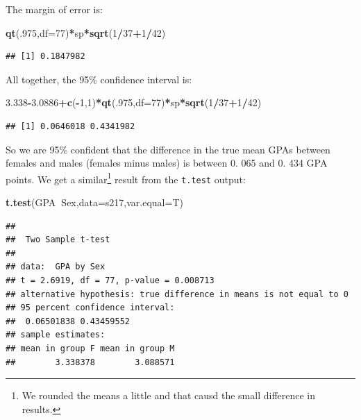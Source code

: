 \documentclass[]{book}
\newenvironment{Shaded}{\begin{snugshade}}{\end{snugshade}}
\newcommand{\KeywordTok}[1]{\textcolor[rgb]{0.13,0.29,0.53}{\textbf{#1}}}
\newcommand{\DataTypeTok}[1]{\textcolor[rgb]{0.13,0.29,0.53}{#1}}
\newcommand{\DecValTok}[1]{\textcolor[rgb]{0.00,0.00,0.81}{#1}}
\newcommand{\FloatTok}[1]{\textcolor[rgb]{0.00,0.00,0.81}{#1}}
\newcommand{\OperatorTok}[1]{\textcolor[rgb]{0.81,0.36,0.00}{\textbf{#1}}}
\newcommand{\NormalTok}[1]{#1}
\let\rmarkdownfootnote\footnote%
\def\footnote{\protect\rmarkdownfootnote}
\begin{document}
The margin of error is:

\begin{Shaded}
\begin{Highlighting}[]
\KeywordTok{qt}\NormalTok{(.}\DecValTok{975}\NormalTok{,}\DataTypeTok{df=}\DecValTok{77}\NormalTok{)}\OperatorTok{*}\NormalTok{sp}\OperatorTok{*}\KeywordTok{sqrt}\NormalTok{(}\DecValTok{1}\OperatorTok{/}\DecValTok{37}\OperatorTok{+}\DecValTok{1}\OperatorTok{/}\DecValTok{42}\NormalTok{)}
\end{Highlighting}
\end{Shaded}

\begin{verbatim}
## [1] 0.1847982
\end{verbatim}

All together, the 95\% confidence interval is:

\begin{Shaded}
\begin{Highlighting}[]
\FloatTok{3.338}\OperatorTok{-}\FloatTok{3.0886}\OperatorTok{+}\KeywordTok{c}\NormalTok{(}\OperatorTok{-}\DecValTok{1}\NormalTok{,}\DecValTok{1}\NormalTok{)}\OperatorTok{*}\KeywordTok{qt}\NormalTok{(.}\DecValTok{975}\NormalTok{,}\DataTypeTok{df=}\DecValTok{77}\NormalTok{)}\OperatorTok{*}\NormalTok{sp}\OperatorTok{*}\KeywordTok{sqrt}\NormalTok{(}\DecValTok{1}\OperatorTok{/}\DecValTok{37}\OperatorTok{+}\DecValTok{1}\OperatorTok{/}\DecValTok{42}\NormalTok{)}
\end{Highlighting}
\end{Shaded}

\begin{verbatim}
## [1] 0.0646018 0.4341982
\end{verbatim}

So we are 95\% confident that the difference in the true mean GPAs
between females and males (females minus males) is between 0. 065 and 0.
434 GPA points. We get a similar\footnote{We rounded the means a little
  and that causd the small difference in results.} result from the
\texttt{t.test} output:

\begin{Shaded}
\begin{Highlighting}[]
\KeywordTok{t.test}\NormalTok{(GPA}\OperatorTok{~}\NormalTok{Sex,}\DataTypeTok{data=}\NormalTok{s217,}\DataTypeTok{var.equal=}\NormalTok{T)}
\end{Highlighting}
\end{Shaded}

\begin{verbatim}
## 
##  Two Sample t-test
## 
## data:  GPA by Sex
## t = 2.6919, df = 77, p-value = 0.008713
## alternative hypothesis: true difference in means is not equal to 0
## 95 percent confidence interval:
##  0.06501838 0.43459552
## sample estimates:
## mean in group F mean in group M 
##        3.338378        3.088571
\end{verbatim}
\end{document}
